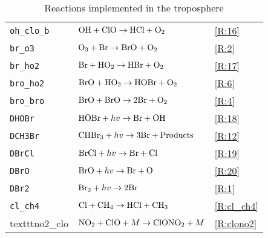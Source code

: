 \begin{table}[ht]
{\begin{tabular}{|l|l|l|}
\texttt{oh\_clo\_b} & $\mathrm{OH} + \mathrm{ClO} \rightarrow \mathrm{HCl} + \mathrm{O_2}$                              & \ref{R:16}\\
\texttt{br\_o3}     & $\mathrm{O_3} + \mathrm{Br} \rightarrow \mathrm{BrO} + \mathrm{O_2}$                              & \ref{R:2} \\
\texttt{br\_ho2}    & $\mathrm{Br} + \mathrm{HO_2} \rightarrow \mathrm{HBr} + \mathrm{O_2}$                             & \ref{R:17}\\
\texttt{bro\_ho2}   & $\mathrm{BrO} + \mathrm{HO_2} \rightarrow \mathrm{HOBr} + \mathrm{O_2}$                           & \ref{R:6} \\
\texttt{bro\_bro}   & $\mathrm{BrO} + \mathrm{BrO} \rightarrow 2\mathrm{Br} + \mathrm{O_2}$                             & \ref{R:4} \\
\texttt{DHOBr}      & $\mathrm{HOBr} + hv \rightarrow \mathrm{Br} + \mathrm{OH}$                                      & \ref{R:18} \\
\texttt{DCH3Br}     & $\mathrm{CHBr_3} + hv \rightarrow 3\mathrm{Br} + \mathrm{Products}$                             & \ref{R:12} \\
\texttt{DBrCl}      & $\mathrm{BrCl} + hv \rightarrow \mathrm{Br} + \mathrm{Cl}$                                      & \ref{R:19} \\
\texttt{DBrO}       & $\mathrm{BrO} + hv \rightarrow \mathrm{Br} + \mathrm{O}$                                        & \ref{R:20} \\
\texttt{DBr2}       & $\mathrm{Br_2} + hv \rightarrow 2\mathrm{Br} $                                                & \ref{R:1} \\
\texttt{cl\_ch4}    & $\mathrm{Cl} + \mathrm{CH_4} \rightarrow \mathrm{HCl} + \mathrm{CH_3} $                           & \ref{R:cl_ch4}\\
texttt{no2\_clo}    & $\mathrm{NO_2} + \mathrm{ClO} + M \rightarrow \mathrm{ClONO_2} + M $                            & \ref{R:clono2}\\
\hline
\end{tabular}
}
\caption{Reactions implemented in the troposphere}
\label{tab:3}
\end{table}